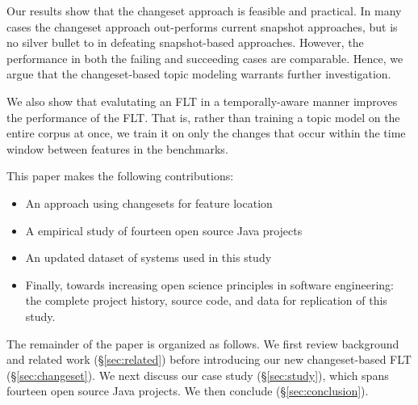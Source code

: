 Our results show that the changeset approach is feasible and practical.
In many cases the changeset approach out-performs current snapshot approaches, but is no silver bullet to in defeating snapshot-based approaches.
However, the performance in both the failing and succeeding cases are comparable.
Hence, we argue that the changeset-based topic modeling warrants further investigation.

We also show that evalutating an FLT in a temporally-aware manner improves the performance of the FLT.
That is, rather than training a topic model on the entire corpus at once,
we train it on only the changes that occur within the time window between features in the benchmarks.

This paper makes the following contributions:

\begin{itemize}
    \item An approach using changesets for feature location
    \item A empirical study of fourteen open source Java projects
    \item An updated dataset of systems used in this study
    \item Finally, towards increasing open science principles in software engineering:
        the complete project history, source code, and data for replication of this study.
\end{itemize}

The remainder of the paper is organized as follows.
We first review background and related work (\S\ref{sec:related})
before introducing our new changeset-based FLT (\S\ref{sec:changeset}).
We next discuss our case study (\S\ref{sec:study}), which spans fourteen open source Java projects.
We then conclude (\S\ref{sec:conclusion}).

